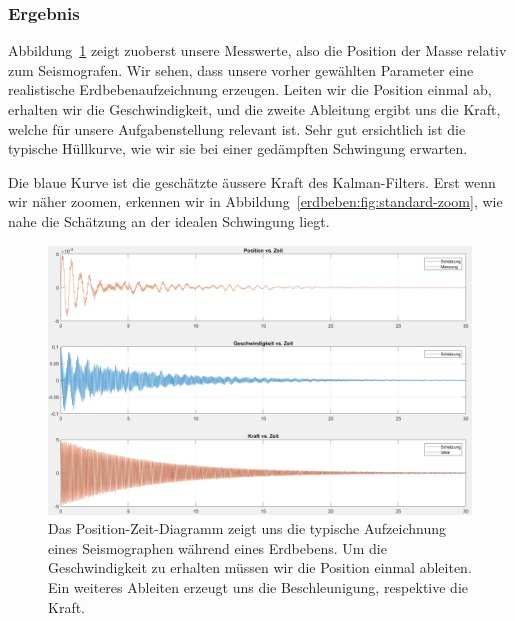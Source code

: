 \subsubsection{Ergebnis}

Abbildung~\ref{erdbeben:fig:standard-alles} zeigt zuoberst unsere Messwerte,
also die Position der Masse relativ zum Seismografen.
Wir sehen, dass unsere vorher gewählten Parameter eine realistische Erdbebenaufzeichnung erzeugen.
Leiten wir die Position einmal ab, erhalten wir die Geschwindigkeit,
und die zweite Ableitung ergibt uns die Kraft, welche für unsere Aufgabenstellung relevant ist.
Sehr gut ersichtlich ist die typische Hüllkurve, wie wir sie bei einer gedämpften Schwingung erwarten.

Die blaue Kurve ist die geschätzte äussere Kraft des Kalman-Filters.
Erst wenn wir näher zoomen, erkennen wir in Abbildung~\ref{erdbeben:fig:standard-zoom},
wie nahe die Schätzung an der idealen Schwingung liegt.

\begin{figure}
	\begin{center}
		\includegraphics[width=\linewidth,keepaspectratio]{papers/erdbeben/Standard_alles.PNG}
		\caption{Das Position-Zeit-Diagramm zeigt uns die typische Aufzeichnung eines Seismographen während eines Erdbebens. Um die Geschwindigkeit zu erhalten müssen wir die Position einmal ableiten. Ein weiteres Ableiten erzeugt uns die Beschleunigung, respektive die Kraft.}
    \label{erdbeben:fig:standard-alles}
	\end{center}
\end{figure}

